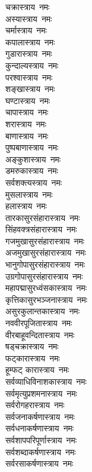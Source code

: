 \begin{flushleft}
\begin{multicols}{2}
चक्रास्त्राय~नमः\\
अस्यास्त्राय~नमः\\
चर्मास्त्राय~नमः\hfill{}\\
कपालास्त्राय~नमः\\
गुडारास्त्राय~नमः  \\
कुन्दाल्यस्त्राय~नमः \\
परश्वास्त्राय~नमः\\
शङ्खास्त्राय~नमः\\
घण्टास्त्राय~नमः\\
चापास्त्राय~नमः\\
शरास्त्राय~नमः\\
बाणास्त्राय~नमः\\
पुष्पबाणास्त्राय~नमः\hfill{}\\
अङ्कुशास्त्राय~नमः\\
डमरुकास्त्राय~नमः\\
सर्वशक्त्यस्त्राय~नमः\\
मुसलास्त्राय~नमः\\
हलास्त्राय~नमः\\
तारकासुरसंहारास्त्राय~नमः\\
सिंहवक्त्रसंहारास्त्राय~नमः\\
गजमुखासुरसंहारास्त्राय~नमः\\
अजमुखासुरसंहारास्त्राय~नमः\\
भानुगोपासुरसंहारास्त्राय~नमः \hfill{}\\
उग्रगोपासुरसंहारास्त्राय~नमः \\
महापद्मासुरध्वंसकास्त्राय~नमः\\
कृत्तिकासुरभञ्जनास्त्राय~नमः\\
असुरकुलान्तकास्त्राय~नमः\\
नववीरपूजितास्त्राय~नमः\\
वीरबाहूवन्दितास्त्राय~नमः\\
षड्चक्रास्त्राय~नमः\\
फट्कारास्त्राय~नमः\\
हूम्फट् कारास्त्राय~नमः\\
सर्वव्याधिविनाशकास्त्राय~नमः\hfill{}\\
सर्वमृत्युप्रशमनास्त्राय~नमः\\
सर्वरोगहरास्त्राय~नमः\\
सर्वजनाकर्षणास्त्राय~नमः\\
सर्वधनाकर्षणास्त्राय~नमः\\
सर्वशापपरिपूर्णास्त्राय~नमः\\
सर्वशब्दाकर्षणास्त्राय~नमः\\
सर्वरसाकर्षणास्त्राय~नमः\\

\end{multicols}
\end{flushleft}
